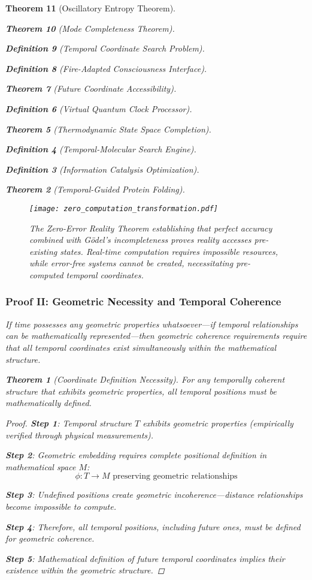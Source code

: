 \documentclass[12pt,a4paper]{article}
\newtheorem{theorem}{Theorem}[section]
\newtheorem{definition}[theorem]{Definition}
\begin{document}
\begin{theorem}[Oscillatory Entropy Theorem]
\begin{theorem}[Mode Completeness Theorem]
\begin{enumerate}
\begin{definition}[Temporal Coordinate Search Problem]
\begin{algorithm}
\begin{definition}[Fire-Adapted Consciousness Interface]
\begin{theorem}[Future Coordinate Accessibility]
\begin{definition}[Virtual Quantum Clock Processor]
\begin{itemize}
\begin{itemize}
\begin{theorem}[Thermodynamic State Space Completion]
\begin{definition}[Temporal-Molecular Search Engine]
\begin{definition}[Information Catalysis Optimization]
\begin{algorithm}
\begin{theorem}[Temporal-Guided Protein Folding]
\begin{table}[h]
\begin{figure}[h]
\centering
\texttt{[image: zero\_computation\_transformation.pdf]}
\caption{The Zero-Error Reality Theorem establishing that perfect accuracy combined with Gödel's incompleteness proves reality accesses pre-existing states. Real-time computation requires impossible resources, while error-free systems cannot be created, necessitating pre-computed temporal coordinates.}
\label{fig:zero_computation_transformation}
\end{figure}

\subsubsection{Proof II: Geometric Necessity and Temporal Coherence}

If time possesses any geometric properties whatsoever—if temporal relationships can be mathematically represented—then geometric coherence requirements require that all temporal coordinates exist simultaneously within the mathematical structure.

\begin{theorem}[Coordinate Definition Necessity]
For any temporally coherent structure that exhibits geometric properties, all temporal positions must be mathematically defined.
\end{theorem}

\begin{proof}
\textbf{Step 1}: Temporal structure $T$ exhibits geometric properties (empirically verified through physical measurements).

\textbf{Step 2}: Geometric embedding requires complete positional definition in mathematical space $M$:
$$\phi: T \to M \text{ preserving geometric relationships}$$

\textbf{Step 3}: Undefined positions create geometric incoherence—distance relationships become impossible to compute.

\textbf{Step 4}: Therefore, all temporal positions, including future ones, must be defined for geometric coherence.

\textbf{Step 5}: Mathematical definition of future temporal coordinates implies their existence within the geometric structure.
\end{proof}


\end{table}
\end{theorem}
\end{algorithm}
\end{definition}
\end{definition}
\end{theorem}
\end{itemize}
\end{itemize}
\end{definition}
\end{theorem}
\end{definition}
\end{algorithm}
\end{definition}
\end{enumerate}
\end{theorem}
\end{theorem}
\end{document}
